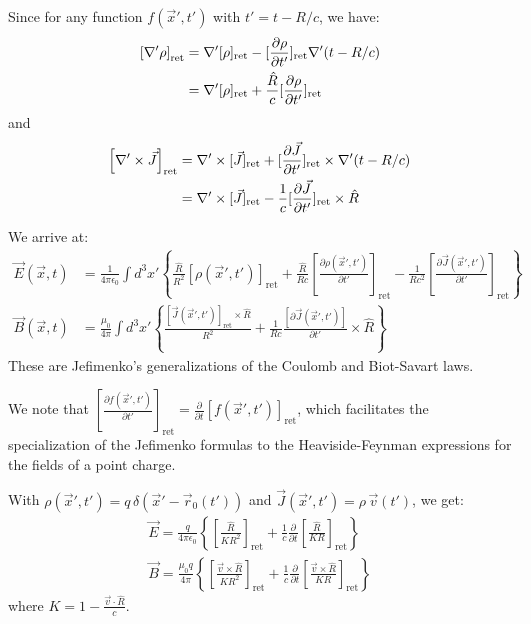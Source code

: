 \documentclass{article}
\begin{document}
	Since for any function \(f(\vec{x}', t')\) with \(t' = t - R/c\), we have:
	\begin{align}
		\left[ \nabla'\rho \right]_{\text{ret}} &= \nabla'[\rho]_{\text{ret}} - [\frac{\partial\rho}{\partial t'}]_{\text{ret}} \nabla'(t-R/c) \notag \\
		&= \nabla'[\rho]_{\text{ret}} + \frac{\hat{R}}{c} [\frac{\partial\rho}{\partial t'}]_{\text{ret}}
	\end{align}
	and
	\begin{align}
		\left[ \nabla' \times \vec{J} \right]_{\text{ret}} &= \nabla' \times [\vec{J}]_{\text{ret}} + [\frac{\partial\vec{J}}{\partial t'}]_{\text{ret}} \times \nabla'(t-R/c) \notag \\
		&= \nabla' \times [\vec{J}]_{\text{ret}} - \frac{1}{c} [\frac{\partial\vec{J}}{\partial t'}]_{\text{ret}} \times \hat{R}
	\end{align}
	
	We arrive at:
	\begin{align}
		\vec{E}(\vec{x}, t) &= \frac{1}{4\pi\epsilon_0} \int d^3x' \left\{ \frac{\hat{R}}{R^2}[\rho(\vec{x}', t')]_{\text{ret}} + \frac{\hat{R}}{Rc}\left[\frac{\partial\rho(\vec{x}', t')}{\partial t'}\right]_{\text{ret}} - \frac{1}{Rc^2}\left[\frac{\partial\vec{J}(\vec{x}', t')}{\partial t'}\right]_{\text{ret}} \right\} \\
		\vec{B}(\vec{x}, t) &= \frac{\mu_0}{4\pi} \int d^3x' \left\{ \frac{[\vec{J}(\vec{x}', t')]_{\text{ret}} \times \hat{R}}{R^2} + \frac{1}{Rc} \frac{[\partial\vec{J}(\vec{x}', t')]}{\partial t'} \times \hat{R} \right\}
	\end{align}
	These are Jefimenko's generalizations of the Coulomb and Biot-Savart laws.
	
	We note that \(\left[ \frac{\partial f(\vec{x}', t')}{\partial t'} \right]_{\text{ret}} = \frac{\partial}{\partial t} [f(\vec{x}', t')]_{\text{ret}}\), which facilitates the specialization of the Jefimenko formulas to the Heaviside-Feynman expressions for the fields of a point charge.
	
	With \(\rho(\vec{x}', t') = q\,\delta(\vec{x}' - \vec{r}_0(t'))\) and \(\vec{J}(\vec{x}', t') = \rho\,\vec{v}(t')\), we get:
	\begin{gather}
		\vec{E} = \frac{q}{4\pi\epsilon_0} \left\{ \left[ \frac{\hat{R}}{KR^2} \right]_{\text{ret}} + \frac{1}{c} \frac{\partial}{\partial t} \left[ \frac{\hat{R}}{KR} \right]_{\text{ret}} \right\} \\
		\vec{B} = \frac{\mu_0 q}{4\pi} \left\{ \left[ \frac{\vec{v} \times \hat{R}}{KR^2} \right]_{\text{ret}} + \frac{1}{c} \frac{\partial}{\partial t} \left[ \frac{\vec{v} \times \hat{R}}{KR} \right]_{\text{ret}} \right\}
	\end{gather}
	where \(K = 1 - \frac{\vec{v} \cdot \hat{R}}{c}\).
	
\end{document}
